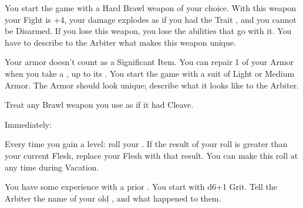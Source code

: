 {    

    You start the game with a Hard Brawl weapon of your choice.  With this weapon  your Fight \RO is +4, your damage explodes as if you had the Trait , and you cannot be Disarmed. If you lose this weapon, you lose the abilities that go with it.  You have to describe to the Arbiter what makes this weapon unique.


    Your armor doesn't count as a Significant Item.  You can repair 1 \UD of your Armor when you take a , 
    up to its \MAX \UD.   You start the game with a suit of Light or Medium Armor.  The Armor should look unique; describe what it looks like to the Arbiter.

    
    Treat any Brawl weapon you use as if it had Cleave.


    Immediately:

    Every time you gain a level:  roll your \VIG.  If the result of your roll is greater than your current Flesh, replace your Flesh with that result.  You can make this roll at any time during Vacation.



    You have some experience with a prior .  You start with d6+1 Grit.  Tell the Arbiter the name of your old , and what happened to them.




}
